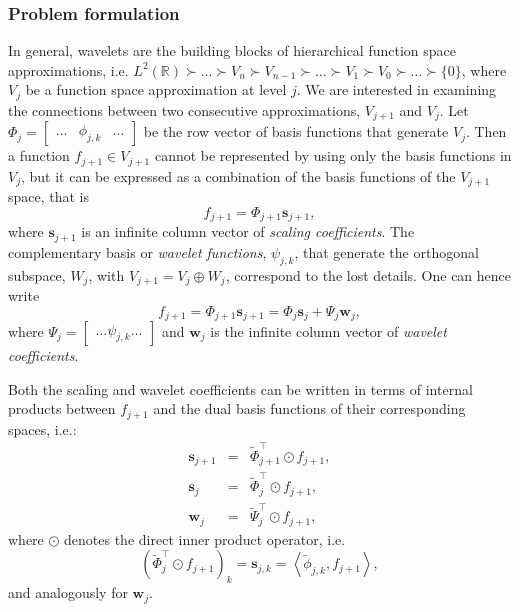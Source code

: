 \documentclass[graybox]{svmult}
\begin{document}
\subsubsection{Problem formulation}
In general, wavelets are the building blocks of hierarchical function space approximations, i.e. $L^2(\mathbb{R}) \succ \ldots \succ V_n \succ V_{n-1} \succ \ldots \succ V_{1} \succ V_{0} \succ \ldots \succ \{0\}$, where $V_{j}$ be a function space approximation at level $j$. We are interested in examining the connections between two consecutive approximations, $V_{j+1}$ and $V_{j}$. Let $\Phi_j = \begin{bmatrix} \ldots & \phi_{j,k} & \ldots \end{bmatrix}$ be the row vector of basis functions that generate $V_j$. Then a function $f_{j+1} \in V_{j+1}$ cannot be represented by using only the basis functions in $V_{j}$, but it can be expressed as a combination of the basis functions of the $V_{j+1}$ space, that is
\begin{equation}
f_{j+1} = \Phi_{j+1} \mathbf{s}_{j+1},
\label{eq_cds:f_in_j_plus_one}
\end{equation}
where $\mathbf{s}_{j+1}$ is an infinite column vector of \emph{scaling coefficients}. The  complementary basis or \emph{wavelet functions}, $\psi_{j,k}$, that generate the orthogonal subspace, $W_j$, with $V_{j+1} = V_j \oplus W_j$, correspond to the lost details. One can hence write
\begin{equation}
f_{j+1} = \Phi_{j+1}\mathbf{s}_{j+1} = \Phi_j \mathbf{s}_j + \Psi_j \mathbf{w}_j,
\label{eq_cds:f_in_j}
\end{equation} 
where $\Psi_j = \begin{bmatrix} \ldots \psi_{j,k} \ldots \end{bmatrix}$ and $\mathbf{w}_j$ is the infinite column vector of \emph{wavelet coefficients}.


Both the scaling and wavelet coefficients can be written in terms of internal products between $f_{j+1}$ and the dual basis functions of their corresponding spaces, i.e.:
\begin{eqnarray}
\mathbf{s}_{j+1} & = & \tilde{\Phi}_{j+1}^\intercal \odot f_{j+1},  \label{eq_cds:inner1}\\
\mathbf{s}_j & = &  \tilde{\Phi}_j^\intercal \odot f_{j+1}, \label{eq_cds:inner2}\\
\mathbf{w}_j & = & \tilde{\Psi}_j^\intercal \odot f_{j+1}, \label{eq_cds:inner3}
\end{eqnarray}
where $\odot$ denotes the direct inner product operator, i.e.
\begin{equation}
\left(  \tilde{\Phi}_j^\intercal \odot f_{j+1} \right)_k = \mathbf{s}_{j,k} = \left< \tilde{\phi}_{j,k}, f_{j+1} \right>,
\end{equation}
and analogously for $\mathbf{w}_j$.
\end{document}
